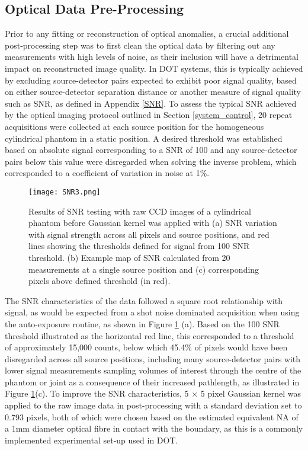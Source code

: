 \documentclass[twoside]{bhamthesis}
\theoremstyle{definition}
\begin{document}
\subsection{Optical Data Pre-Processing}

\label{Optical Data Cleaning}

Prior to any fitting or reconstruction of optical anomalies, a crucial additional post-processing step was to first clean the optical data by filtering out any measurements with high levels of noise, as their inclusion will have a detrimental impact on  reconstructed image quality. In DOT systems, this is typically achieved by excluding source-detector pairs expected to exhibit poor signal quality, based on either source-detector separation distance or another measure of signal quality such as SNR, as defined in Appendix \ref{SNR}. To assess the typical SNR achieved by the optical imaging protocol outlined in Section \ref{system_control}, 20 repeat acquisitions were collected at each source position for the homogeneous cylindrical phantom in a static position. A desired threshold was established based on absolute signal corresponding to a SNR of 100 and any source-detector pairs below this value were disregarded when solving the inverse problem, which corresponded to a coefficient of variation in noise at 1\%.

\begin{figure}[!ht]
\centering\texttt{[image: SNR3.png]}
\caption{Results of SNR testing with raw CCD images of a cylindrical phantom before Gaussian kernel was applied with (a) SNR variation with signal strength across all pixels and source positions, and red lines showing the thresholds defined for signal from 100 SNR threshold. (b) Example map of SNR calculated from 20 measurements at a single source position and (c) corresponding pixels above defined threshold (in red).}
\label{fig:SNR3}
\end{figure}

The SNR characteristics of the data followed a square root relationship with signal, as would be expected from a shot noise dominated acquisition when using the auto-exposure routine, as shown in Figure \ref{fig:SNR3} (a). Based on the 100 SNR threshold illustrated as the horizontal red line, this corresponded to a threshold of approximately 15,000 counts, below which 45.4\% of pixels would have been disregarded across all source positions, including many source-detector pairs with lower signal measurements sampling volumes of interest through the centre of the phantom or joint as a consequence of their increased pathlength, as illustrated in Figure \ref{fig:SNR3}(c). To improve the SNR characteristics, 5 $\times$ 5 pixel Gaussian kernel was applied to the raw image data in post-processing with a standard deviation set to 0.793 pixels, both of which were chosen based on the estimated equivalent NA of a 1mm diameter optical fibre in contact with the boundary, as this is a commonly implemented experimental set-up used in DOT.
\end{document}
